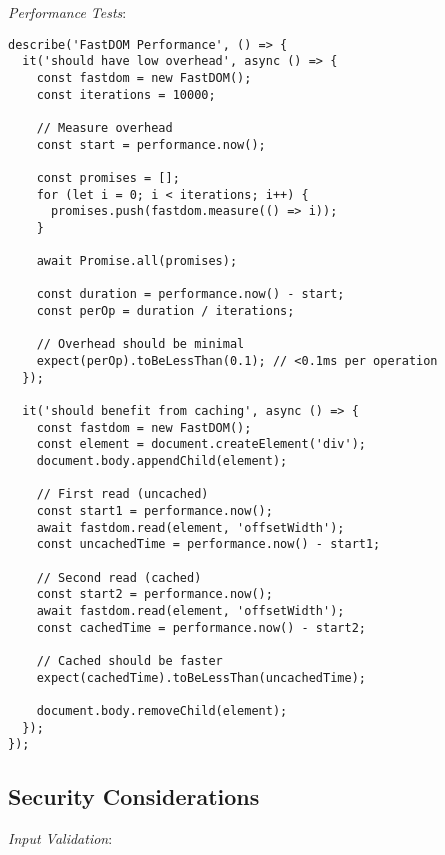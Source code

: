 \documentclass[11pt]{article}
\begin{document}
\emph{Performance Tests}:

\begin{verbatim}
describe('FastDOM Performance', () => {
  it('should have low overhead', async () => {
    const fastdom = new FastDOM();
    const iterations = 10000;
    
    // Measure overhead
    const start = performance.now();
    
    const promises = [];
    for (let i = 0; i < iterations; i++) {
      promises.push(fastdom.measure(() => i));
    }
    
    await Promise.all(promises);
    
    const duration = performance.now() - start;
    const perOp = duration / iterations;
    
    // Overhead should be minimal
    expect(perOp).toBeLessThan(0.1); // <0.1ms per operation
  });
  
  it('should benefit from caching', async () => {
    const fastdom = new FastDOM();
    const element = document.createElement('div');
    document.body.appendChild(element);
    
    // First read (uncached)
    const start1 = performance.now();
    await fastdom.read(element, 'offsetWidth');
    const uncachedTime = performance.now() - start1;
    
    // Second read (cached)
    const start2 = performance.now();
    await fastdom.read(element, 'offsetWidth');
    const cachedTime = performance.now() - start2;
    
    // Cached should be faster
    expect(cachedTime).toBeLessThan(uncachedTime);
    
    document.body.removeChild(element);
  });
});
\end{verbatim}
\subsection{Security Considerations}
\label{sec:orgc71350c}

\emph{Input Validation}:
\end{document}
